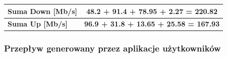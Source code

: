 \documentclass{article}
\begin{document}
\begin{table}[H]
\begin{tabular}{|l|c|c|c|c|c|c|c|c|}
		\textbf{Suma Down {[}Mb/s{]}}                                                                     & \multicolumn{8}{c|}{\textbf{48.2 +  91.4 + 78.95 + 2.27 = 220.82}}                                                            \\ \hline
		\textbf{Suma Up {[}Mb/s{]}}                                                                       & \multicolumn{8}{c|}{\textbf{96.9 + 31.8 + 13.65 + 25.58 = 167.93}}                                                            \\ \hline
	\end{tabular}
\end{table}

\subsubsection{Przepływ generowany przez aplikacje użytkowników}
\end{document}
